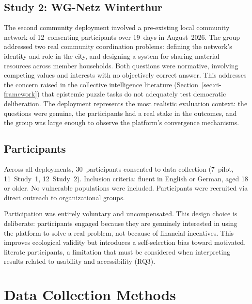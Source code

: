 \documentclass[a4paper, 12pt, twoside]{iviathesis}
\begin{document}
\subsection{Study 2: WG-Netz Winterthur}
\label{sec:study-wg-netz}
The second community deployment involved a pre-existing local community network of 12~consenting participants over 19~days in August~2026. The group addressed two real community coordination problems: defining the network's identity and role in the city, and designing a system for sharing material resources across member households. Both questions were normative, involving competing values and interests with no objectively correct answer. This addresses the concern raised in the collective intelligence literature (Section~\ref{sec:ci-framework}) that epistemic puzzle tasks do not adequately test democratic deliberation. The deployment represents the most realistic evaluation context: the questions were genuine, the participants had a real stake in the outcomes, and the group was large enough to observe the platform's convergence mechanisms.

\subsection{Participants}
\label{sec:participants}
Across all deployments, 30~participants consented to data collection (7~pilot, 11~Study~1, 12~Study~2). Inclusion criteria: fluent in English or German, aged 18 or older. No vulnerable populations were included. Participants were recruited via direct outreach to organizational groups.

Participation was entirely voluntary and uncompensated. This design choice is deliberate: participants engaged because they are genuinely interested in using the platform to solve a real problem, not because of financial incentives. This improves ecological validity but introduces a self-selection bias toward motivated, literate participants, a limitation that must be considered when interpreting results related to usability and accessibility (RQ3). 


\section{Data Collection Methods}
\end{document}
